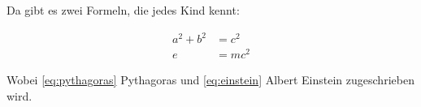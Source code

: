 
Da gibt es zwei Formeln, die jedes Kind kennt: 

\begin{align}
  a^2 + b^2 & = c^2     \label{eq:pythagoras}  \\  
  e & = m c^2           \label{eq:einstein}  
\end{align}

Wobei \eqref{eq:pythagoras} Pythagoras und 
\eqref{eq:einstein} Albert Einstein zugeschrieben wird.
